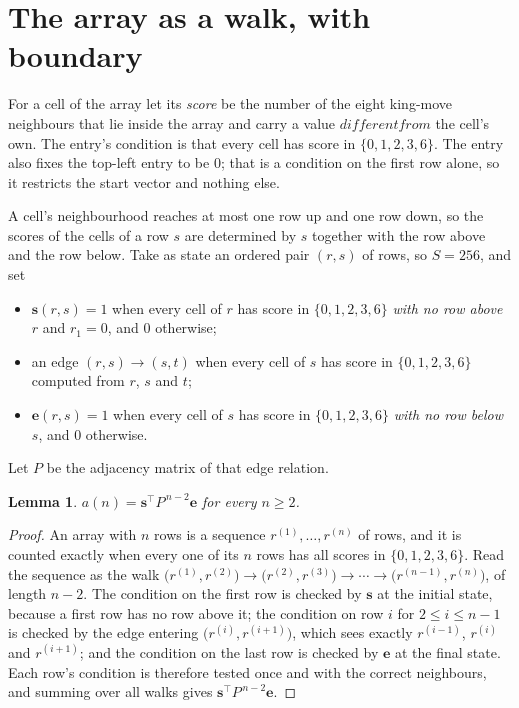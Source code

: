 \documentclass[11pt,a4paper]{article}
\theoremstyle{plain}
\newtheorem{lemma}[theorem]{Lemma}
\theoremstyle{definition}
\begin{document}
\section{The array as a walk, with boundary}

For a cell of the array let its \emph{score} be the number of the eight king-move neighbours that lie inside
the array and carry a value $different from$ the cell's own. The entry's condition is that every cell
has score in $\{0,1,2,3,6\}$. The entry also fixes the top-left entry to be $0$; that is a condition on the first row alone, so it restricts the start vector and nothing else.

A cell's neighbourhood reaches at most one row up and one row down, so the scores of the
cells of a row $s$ are determined by $s$ together with the row above and the row below.
Take as state an ordered pair $(r,s)$ of rows, so $S=256$, and set
\begin{itemize}
\item $\mathbf{s}(r,s)=1$ when every cell of $r$ has score in $\{0,1,2,3,6\}$ \emph{with no row
above $r$} and $r_1=0$, and $0$ otherwise;
\item an edge $(r,s)\to(s,t)$ when every cell of $s$ has score in $\{0,1,2,3,6\}$ computed from
$r$, $s$ and $t$;
\item $\mathbf{e}(r,s)=1$ when every cell of $s$ has score in $\{0,1,2,3,6\}$ \emph{with no row
below $s$}, and $0$ otherwise.
\end{itemize}
Let $P$ be the adjacency matrix of that edge relation.

\begin{lemma}\label{lem:walk}
$a(n)=\mathbf{s}^{\!\top}P^{\,n-2}\mathbf{e}$ for every $n\ge2$.
\end{lemma}

\begin{proof}
An array with $n$ rows is a sequence $r^{(1)},\dots,r^{(n)}$ of rows, and it is counted
exactly when every one of its $n$ rows has all scores in $\{0,1,2,3,6\}$. Read the sequence as the
walk $\bigl(r^{(1)},r^{(2)}\bigr)\to\bigl(r^{(2)},r^{(3)}\bigr)\to\cdots\to
\bigl(r^{(n-1)},r^{(n)}\bigr)$, of length $n-2$. The condition on the first row is
checked by $\mathbf{s}$ at the initial state, because a first row has no row above it; the
condition on row $i$ for $2\le i\le n-1$ is checked by the edge entering
$\bigl(r^{(i)},r^{(i+1)}\bigr)$, which sees exactly $r^{(i-1)}$, $r^{(i)}$ and
$r^{(i+1)}$; and the condition on the last row is checked by $\mathbf{e}$ at the final
state. Each row's condition is therefore tested once and with the correct neighbours, and
summing over all walks gives $\mathbf{s}^{\!\top}P^{\,n-2}\mathbf{e}$.
\end{proof}
\end{document}

